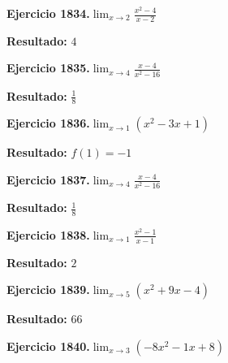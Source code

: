 \documentclass[10pt,a4paper]{article}
\begin{document}
\newpage
\begin{ejbox}
\textbf{Ejercicio 1834.}\quad $\lim_{x\to 2} \frac{x^2-4}{x-2}$
\end{ejbox}

\begin{solbox}
\textbf{Resultado:} \(\displaystyle 4\)
\end{solbox}

\begin{ejbox}
\textbf{Ejercicio 1835.}\quad $\lim_{x\to 4} \frac{x-4}{x^2-16}$
\end{ejbox}

\begin{solbox}
\textbf{Resultado:} \(\displaystyle \frac{1}{8}\)
\end{solbox}

\begin{ejbox}
\textbf{Ejercicio 1836.}\quad $\lim_{x\to 1} (x^2 -3x +1)$
\end{ejbox}

\begin{solbox}
\textbf{Resultado:} \(\displaystyle f(1) = -1\)
\end{solbox}

\newpage
\begin{ejbox}
\textbf{Ejercicio 1837.}\quad $\lim_{x\to 4} \frac{x-4}{x^2-16}$
\end{ejbox}

\begin{solbox}
\textbf{Resultado:} \(\displaystyle \frac{1}{8}\)
\end{solbox}

\begin{ejbox}
\textbf{Ejercicio 1838.}\quad $\lim_{x\to 1} \frac{x^2-1}{x-1}$
\end{ejbox}

\begin{solbox}
\textbf{Resultado:} \(\displaystyle 2\)
\end{solbox}

\begin{ejbox}
\textbf{Ejercicio 1839.}\quad $\lim_{x\to 5} (x^2 +9x -4)$
\end{ejbox}

\begin{solbox}
\textbf{Resultado:} \(\displaystyle 66\)
\end{solbox}

\newpage
\begin{ejbox}
\textbf{Ejercicio 1840.}\quad $\lim_{x\to 3} (-8x^2 -1x +8)$
\end{ejbox}
\end{document}
